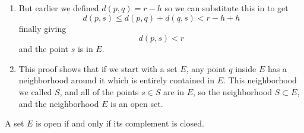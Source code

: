 \begin{proof-dan}
\begin{enumerate}
  \begin{equation*}
    d(p,s)\leq d(p,q)+d(q,s)<d(p,q)+h
  \end{equation*}
  \item{But earlier we defined $d(p,q)=r-h$ so we can substitute this in to get}
  \begin{equation*}
    d(p,s)\leq d(p,q)+d(q,s)<r-h+h
  \end{equation*}
  finally giving
  \begin{equation*}
    d(p,s)<r
  \end{equation*}
  and the point $s$ is in $E$.
  \item{%
    This proof shows that if we start with a set $E$, any point $q$ inside $E$ has a neighborhood around it which is entirely contained in $E$.
    This neighborhood we called $S$, and all of the points $s\in S$ are in $E$, so the neighborhood $S\subset E$, and the neighborhood $E$ is an open set.
  }
  \end{enumerate}
\end{proof-dan}

\begin{thm-dan}[2.23]
  A set $E$ is open if and only if its complement is closed.
\end{thm-dan}

